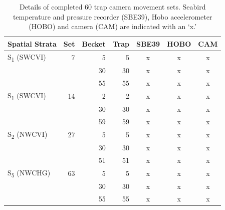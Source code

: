 \documentclass[12pt]{article}\usepackage[]{graphicx}\usepackage[]{color}
\begin{document}
\begin{table}[!h]

\caption{\label{tab:table3}Details of completed 60 trap camera movement sets. Seabird temperature and pressure recorder (SBE39), Hobo accelerometer (HOBO) and camera (CAM) are indicated with an `x.'}
\fontsize{9}{11}\selectfont
\begin{tabular}[t]{lrrrccc}
\toprule
\textbf{Spatial Strata} & \textbf{Set} & \textbf{Becket} & \textbf{Trap} & \textbf{SBE39} & \textbf{HOBO} & \textbf{CAM}\\
\midrule
S\textsubscript{1} (SWCVI) & 7 & 5 & 5 & x & x & x\\
 &  & 30 & 30 & x & x & \vphantom{3} x\\
 &  & 55 & 55 & x & x & \vphantom{1} x\\
\midrule
S\textsubscript{1} (SWCVI) & 14 & 2 & 2 & x & x & x\\
 &  & 30 & 30 & x & x & \vphantom{2} x\\
 &  & 59 & 59 & x & x & x\\
\midrule
S\textsubscript{2} (NWCVI) & 27 & 5 & 5 & x & x & x\\
 &  & 30 & 30 & x & x & \vphantom{1} x\\
 &  & 51 & 51 & x & x & x\\
\midrule
S\textsubscript{5} (NWCHG) & 63 & 5 & 5 & x & x & x\\
 &  & 30 & 30 & x & x & x\\
 &  & 55 & 55 & x & x & x\\
\bottomrule
\end{tabular}
\end{table}
\clearpage
\end{document}
